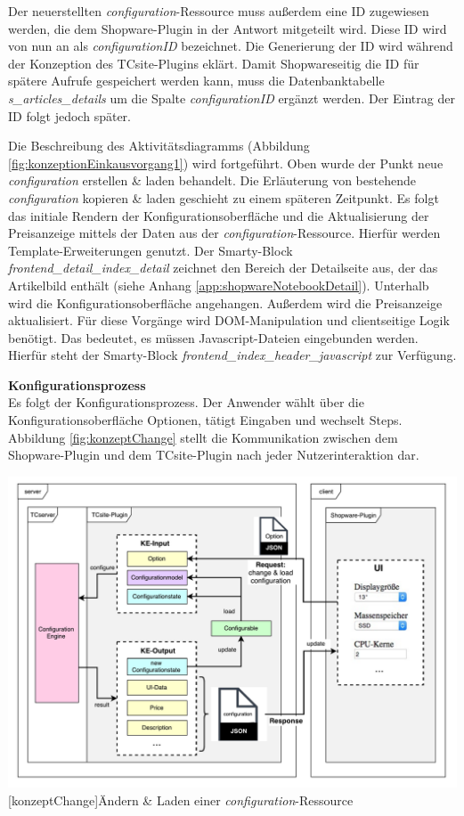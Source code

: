 \documentclass[11pt, a4paper, titlepage, listof=totoc, bibliography=totoc, index=totoc, twoside, openright, headings=normal, draft]{scrreprt}
\begin{document}
Der neuerstellten \emph{configuration}-Ressource muss außerdem eine ID zugewiesen werden, die dem Shopware-Plugin in der Antwort mitgeteilt wird. Diese ID wird von nun an als \emph{configurationID} bezeichnet. Die Generierung der ID wird während der Konzeption des TCsite-Plugins eklärt. Damit Shopwareseitig die ID für spätere Aufrufe gespeichert werden kann, muss die Datenbanktabelle \emph{s\_articles\_details} um die Spalte \emph{configurationID} ergänzt werden. Der Eintrag der ID folgt jedoch später.

Die Beschreibung des Aktivitätsdiagramms (Abbildung \ref{fig:konzeptionEinkausvorgang1}) wird fortgeführt. Oben wurde der Punkt \glqq neue \emph{configuration} erstellen \& laden\grqq{} behandelt. Die Erläuterung von \glqq bestehende \emph{configuration} kopieren \& laden\grqq{} geschieht zu einem späteren Zeitpunkt. Es folgt das initiale Rendern der Konfigurationsoberfläche und die Aktualisierung der Preisanzeige mittels der Daten aus der \emph{configuration}-Ressource. Hierfür werden Template-Erweiterungen genutzt. Der Smarty-Block \emph{frontend\_detail\_index\_detail} zeichnet den Bereich der Detailseite aus, der das Artikelbild enthält (siehe Anhang \ref{app:shopwareNotebookDetail}). Unterhalb wird die Konfigurationsoberfläche angehangen. Außerdem wird die Preisanzeige aktualisiert. Für diese Vorgänge wird DOM-Manipulation und clientseitige Logik benötigt. Das bedeutet, es müssen Javascript-Dateien eingebunden werden. Hierfür steht der Smarty-Block \emph{frontend\_index\_header\_javascript} zur Verfügung.

\textbf{Konfigurationsprozess}\\
Es folgt der Konfigurationsprozess. Der Anwender wählt über die Konfigurationsoberfläche Optionen, tätigt Eingaben und wechselt Steps. Abbildung \ref{fig:konzeptChange} stellt die Kommunikation zwischen dem Shopware-Plugin und dem TCsite-Plugin nach jeder Nutzerinteraktion dar.

\vspace{1em}
\begin{minipage}{\linewidth}
	\centering
	\includegraphics[width=1\linewidth]{Abbildungen/konzeptChange.pdf}
	[konzeptChange]{Ändern \& Laden einer \emph{configuration}-Ressource}
	\label{fig:konzeptChange}
\end{minipage}
\vspace{1em}
\end{document}
